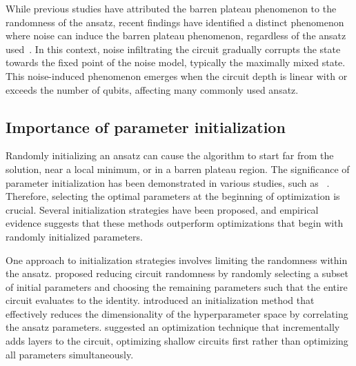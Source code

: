\documentclass[12pt,dvipdfmx,twoside,openright]{report}
\begin{document}
While previous studies have attributed the barren plateau phenomenon to the randomness of the ansatz, recent findings have identified a distinct phenomenon where noise can induce the barren plateau phenomenon, regardless of the ansatz used~\cite{barren-noise}.
In this context, noise infiltrating the circuit gradually corrupts the state towards the fixed point of the noise model, typically the maximally mixed state.
This noise-induced phenomenon emerges when the circuit depth is linear with or exceeds the number of qubits, affecting many commonly used ansatz.


\subsection{Importance of parameter initialization}
Randomly initializing an ansatz can cause the algorithm to start far from the solution, near a local minimum, or in a barren plateau region.
The significance of parameter initialization has been demonstrated in various studies, such as ~\cite{qaoa2}.
Therefore, selecting the optimal parameters at the beginning of optimization is crucial.
Several initialization strategies have been proposed, and empirical evidence suggests that these methods outperform optimizations that begin with randomly initialized parameters.

One approach to initialization strategies involves limiting the randomness within the ansatz.
\cite{init-strategy0} proposed reducing circuit randomness by randomly selecting a subset of initial parameters and choosing the remaining parameters such that the entire circuit evaluates to the identity.
\cite{init-strategy1} introduced an initialization method that effectively reduces the dimensionality of the hyperparameter space by correlating the ansatz parameters.
\cite{init-strategy2} suggested an optimization technique that incrementally adds layers to the circuit, optimizing shallow circuits first rather than optimizing all parameters simultaneously.
\end{document}
